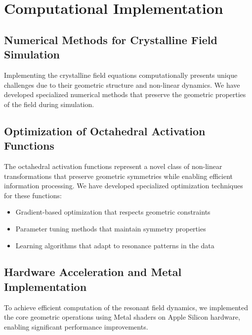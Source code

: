 \documentclass[12pt,letterpaper]{article}
\begin{document}
\section{Computational Implementation}
\label{sec:computational_implementation}

\vspace{2mm}
\subsection{Numerical Methods for Crystalline Field Simulation}
\label{subsec:numerical_methods}

Implementing the crystalline field equations computationally presents unique challenges due to their geometric structure and non-linear dynamics. We have developed specialized numerical methods that preserve the geometric properties of the field during simulation.

\vspace{2mm}
\subsection{Optimization of Octahedral Activation Functions}
\label{subsec:optimization}

The octahedral activation functions represent a novel class of non-linear transformations that preserve geometric symmetries while enabling efficient information processing. We have developed specialized optimization techniques for these functions:

\begin{itemize}
    \item Gradient-based optimization that respects geometric constraints
    \item Parameter tuning methods that maintain symmetry properties
    \item Learning algorithms that adapt to resonance patterns in the data
\end{itemize}

\vspace{2mm}
\subsection{Hardware Acceleration and Metal Implementation}
\label{subsec:hardware_acceleration}

To achieve efficient computation of the resonant field dynamics, we implemented the core geometric operations using Metal shaders on Apple Silicon hardware, enabling significant performance improvements.
\end{document}
